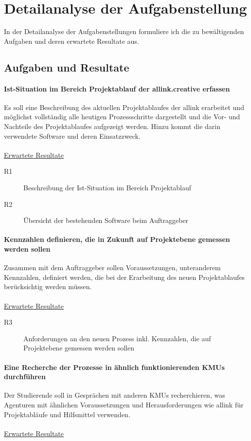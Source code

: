 \chapter{Detailanalyse der Aufgabenstellung}
In der Detailanalyse der Aufgabenstellungen formuliere ich die zu bewältigenden
Aufgaben und deren erwartete Resultate aus.

\section{Aufgaben und Resultate}
\subsubsection{Ist-Situation im Bereich Projektablauf der allink.creative erfassen}
Es soll eine Beschreibung des aktuellen Projektablaufes der allink erarbeitet
und möglichst vollständig alle heutigen Prozessschritte dargestellt und die Vor- 
und Nachteile des Projektablaufes aufgezeigt werden. Hinzu kommt die darin verwendete Software und
deren Einsatzzweck.
\\\\
\underline{Erwartete Resultate}

\begin{description}
    \item[R1] Beschreibung der Ist-Situation im Bereich Projektablauf
    \item[R2] Übersicht der bestehenden Software beim Auftraggeber
\end{description}

\subsubsection{Kennzahlen definieren, die in Zukunft auf Projektebene gemessen werden sollen}
Zusammen mit dem Auftraggeber sollen Voraussetzungen, unteranderem Kennzahlen,
definiert werden, die bei der Erarbeitung des neuen Projektablaufes berücksichtig
werden müssen. 
\\\\
\underline{Erwartete Resultate}

\begin{description}
    \item[R3] Anforderungen an den neuen Prozess inkl. Kennzahlen, die auf 
        Projektebene gemessen werden sollen
\end{description}
  
\subsubsection{Eine Recherche der Prozesse in ähnlich funktionierenden KMUs durchführen}
Der Studierende soll in Gesprächen mit anderen KMUs recherchieren, was Agenturen
mit ähnlichen Voraussetzungen und Herausforderungen wie allink für Projektabläufe
und Hilfsmittel verwenden.
\\\\
\underline{Erwartete Resultate}

